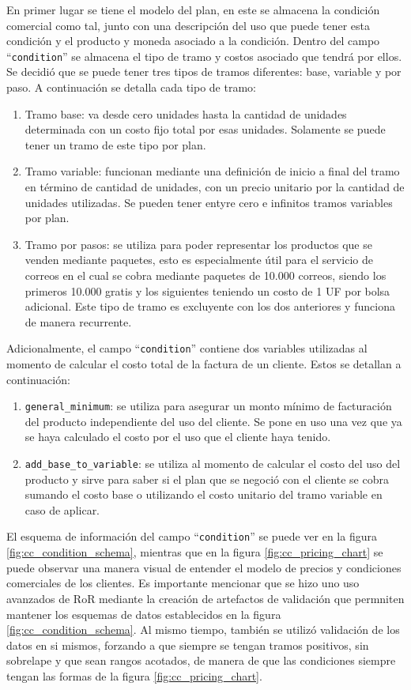     En primer lugar se tiene el modelo del plan, en este se almacena la condición comercial como tal, junto con una descripción del uso que puede tener esta condición y el producto y moneda asociado a la condición. Dentro del campo ``\texttt{condition}'' se almacena el tipo de tramo y costos asociado que tendrá por ellos. Se decidió que se puede tener tres tipos de tramos diferentes: base, variable y por paso. A continuación se detalla cada tipo de tramo:
    \begin{enumerate}
      \item Tramo base: va desde cero unidades hasta la cantidad de unidades determinada con un costo fijo total por esas unidades. Solamente se puede tener un tramo de este tipo por plan.
      \item Tramo variable: funcionan mediante una definición de inicio a final del tramo en término de cantidad de unidades, con un precio unitario por la cantidad de unidades utilizadas. Se pueden tener entyre cero e infinitos tramos variables por plan.
      \item Tramo por pasos: se utiliza para poder representar los productos que se venden mediante paquetes, esto es especialmente útil para el servicio de correos en el cual se cobra mediante paquetes de 10.000 correos, siendo los primeros 10.000 gratis y los siguientes teniendo un costo de 1 UF por bolsa adicional. Este tipo de tramo es excluyente con los dos anteriores y funciona de manera recurrente.
    \end{enumerate}
    
    Adicionalmente, el campo ``\texttt{condition}'' contiene dos variables utilizadas al momento de calcular el costo total de la factura de un cliente. Estos se detallan a continuación:
    \begin{enumerate}
      \item \texttt{general\_minimum}: se utiliza para asegurar un monto mínimo de facturación del producto independiente del uso del cliente. Se pone en uso una vez que ya se haya calculado el costo por el uso que el cliente haya tenido.
      \item \texttt{add\_base\_to\_variable}: se utiliza al momento de calcular el costo del uso del producto y sirve para saber si el plan que se negoció con el cliente se cobra sumando el costo base o utilizando el costo unitario del tramo variable en caso de aplicar.
    \end{enumerate}
    
    El esquema de información del campo ``\texttt{condition}'' se puede ver en la figura \ref{fig:cc_condition_schema}, mientras que en la figura \ref{fig:cc_pricing_chart} se puede observar una manera visual de entender el modelo de precios y condiciones comerciales de los clientes. Es importante mencionar que se hizo uno uso avanzados de RoR mediante la creación de artefactos de validación que permniten mantener los esquemas de datos establecidos en la figura \ref{fig:cc_condition_schema}. Al mismo tiempo, también se utilizó validación de los datos en si mismos, forzando a que siempre se tengan tramos positivos, sin sobrelape y que sean rangos acotados, de manera de que las condiciones siempre tengan las formas de la figura \ref{fig:cc_pricing_chart}.
    
